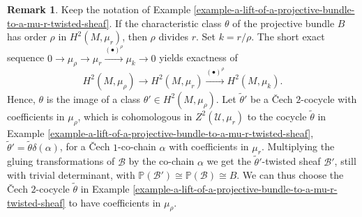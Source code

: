 \documentclass[12pt]{amsart}
\numberwithin{equation}{subsection}
\theoremstyle{plain}
\theoremstyle{definition}
\newtheorem{rem}[thm]{Remark}
\newcommand{\B}{{\mathcal B}}
\newcommand{\U}{{\mathcal U}}
\newcommand{\ZZ}{{\mathbb Z}}
\newcommand{\PP}{{\mathbb P}}
\newcommand{\RightArrowOf}[1]{\stackrel{#1}{\rightarrow}}
\begin{document}
\begin{rem}
\label{remark-twisting-cocycle-can-be-chosen-in-mu-order-of-Brauer-class}
Keep the notation of Example \ref{example-a-lift-of-a-projective-bundle-to-a-mu-r-twisted-sheaf}.
If the characteristic class $\theta$ of the projective bundle $B$ 
has order $\rho$ in $H^2(M,\mu_r)$, then $\rho$ divides $r$. Set $k=r/\rho$. The short exact sequence
$0\rightarrow \mu_\rho\rightarrow \mu_r\RightArrowOf{(\bullet)^\rho}\mu_k\rightarrow 0$ yields exactness of
\[
H^2(M,\mu_\rho)\rightarrow H^2(M,\mu_r)\RightArrowOf{(\bullet)^\rho} H^2(M,\mu_k).
\]
Hence, $\theta$ is the image of a class $\theta'\in H^2(M,\mu_\rho).$
Let $\tilde{\theta}'$ be a \v{C}ech $2$-cocycle with coefficients in $\mu_\rho$, which is cohomologous in $Z^2(\U,\mu_r)$ to the cocycle $\tilde{\theta}$ in Example 
\ref{example-a-lift-of-a-projective-bundle-to-a-mu-r-twisted-sheaf}, $\tilde{\theta}'=\tilde{\theta}\delta(\alpha)$, for a \v{C}ech $1$-co-chain $\alpha$ with coefficients in $\mu_r$. Multiplying the gluing transformations of $\B$ by the co-chain $\alpha$ we get the $\tilde{\theta}'$-twisted sheaf $\B'$, still with trivial determinant, with
$\PP(\B')\cong\PP(\B)\cong B$.
We can thus choose the \v{C}ech $2$-cocycle $\tilde{\theta}$ in Example \ref{example-a-lift-of-a-projective-bundle-to-a-mu-r-twisted-sheaf}
to have coefficients in $\mu_\rho$. 
\end{rem}
\end{document}
